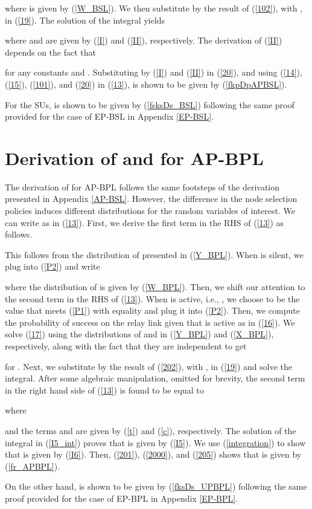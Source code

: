 \documentclass[journal,twocolumn]{IEEEtran}
\begin{document}
where  is given by (\ref{W_BSL}). We then substitute by the result of (\ref{102}), with , in (\ref{19}). The solution of the integral yields 

where  and  are given by (\ref{I}) and (\ref{II}), respectively. The derivation of (\ref{II}) depends on the fact that

for any constants  and . Substituting by (\ref{I}) and (\ref{II}) in (\ref{20}), and using (\ref{14}), (\ref{15}), (\ref{101}), and (\ref{20}) in (\ref{13}),  is shown to be given by (\ref{fkpDpAPBSL}).

For the SUs,  is shown to be given by (\ref{fsksDs_BSL}) following the same proof provided for the case of EP-BSL in Appendix \ref{EP-BSL}.


\section{Derivation of  and  for AP-BPL} \label{AP-BPL}
The derivation of  for AP-BPL follows the same footsteps of the derivation presented in Appendix \ref{AP-BSL}. However, the difference in the node selection policies induces different distributions for the random variables of interest. We can write  as in (\ref{13}). First, we derive the first term in the RHS of (\ref{13}) as follows.

This follows from the distribution of  presented in (\ref{Y_BPL}). 
When  is silent, we plug  into (\ref{P2}) and write

where the distribution of  is given by (\ref{W_BPL}).
Then, we shift our attention to the second term in the RHS of (\ref{13}).
When  is active, i.e., , we choose  to be the value that meets (\ref{P1}) with equality and plug it into (\ref{P2}).
Then, we compute the probability of success on the relay link given that  is active as in (\ref{16}). 
We solve (\ref{17}) using the distributions of  and  in (\ref{Y_BPL}) and (\ref{X_BPL}), respectively, along with the fact that they are independent to get

for . Next, we substitute by the result of (\ref{202}), with , in (\ref{19}) and solve the integral. After some algebraic manipulation, omitted for brevity, the second term in the right hand side of (\ref{13}) is found to be equal to

where

and the terms  and  are given by (\ref{t}) and (\ref{c}), respectively. The solution of the integral in (\ref{I5_int}) proves that  is given by (\ref{I5}). We use (\ref{integration}) to show that  is given by (\ref{I6}). Then, (\ref{201}), (\ref{2000}), and (\ref{205}) shows that  is given by (\ref{fr_APBPL}).  

On the other hand,  is shown to be given by (\ref{fksDs_UPBPL}) following the same proof provided for the case of EP-BPL in Appendix \ref{EP-BPL}.


\renewcommand{\baselinestretch}{1.5}




\end{document}
